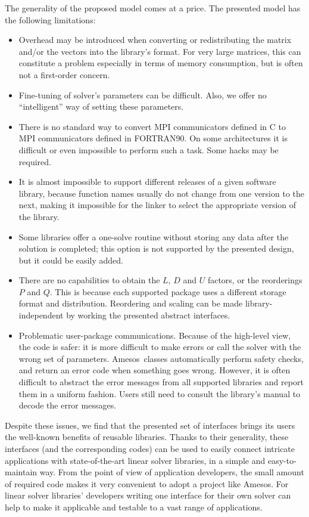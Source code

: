 \documentclass{llncs}
\newcommand{\amesos}{{\sc Amesos}}
\begin{document}
The generality of the proposed model comes at a price. The presented model has the following
limitations:
\begin{itemize}
\item
Overhead may be introduced when converting or redistributing the
matrix and/or the vectors into the library's format. For very large
matrices, this can constitute a problem especially in terms of
memory consumption, but is often not a first-order concern.
\item
Fine-tuning of solver's parameters can be difficult. Also, we offer no
``intelligent'' way of setting these parameters.  
%
\item There is no standard way to convert MPI communicators defined in C to
MPI communicators defined in FORTRAN90. On some architectures it is difficult
or even impossible to perform such a task. Some hacks may be required.
%
\item
It is almost impossible to support different releases of a given
software library, because function names usually do not change from
one version to the next, making it impossible for the linker to
select the
  appropriate version of the library.
%
\item
Some libraries offer a one-solve routine without storing any data after the
solution is completed; this option is not  supported
by the presented design, but it could be easily added.
%
\item
There are no capabilities to obtain the $L$, $D$ and $U$ factors, or the
reorderings $P$ and $Q$. This is because each supported package uses a
different storage format and distribution. Reordering and scaling can be made
library-independent by working the presented abstract interfaces.
%
\item
Problematic user-package communications. Because of the high-level view, the
code is safer: it is more difficult to make errors or call the solver with the
wrong set of parameters. \amesos\ classes automatically perform safety checks,
      and return an error code when something goes wrong. However,
it is often difficult to abstract the error
messages from all supported libraries and report them in a uniform fashion.
Users still need to consult the library's manual to decode the error messages.
\end{itemize}

Despite these issues, we find that the presented set of interfaces
brings its users the well-known benefits of reusable libraries.
Thanks to their generality, these interfaces (and the corresponding
codes) can be used to easily connect intricate applications with
state-of-the-art linear solver libraries, in a simple and
easy-to-maintain way. From the point of view of application
developers, the small amount of required code makes it very
convenient to adopt a project like \amesos. For linear solver
libraries' developers  writing one interface for their own solver
can help to make it applicable and testable to a vast range of
applications.
\end{document}

